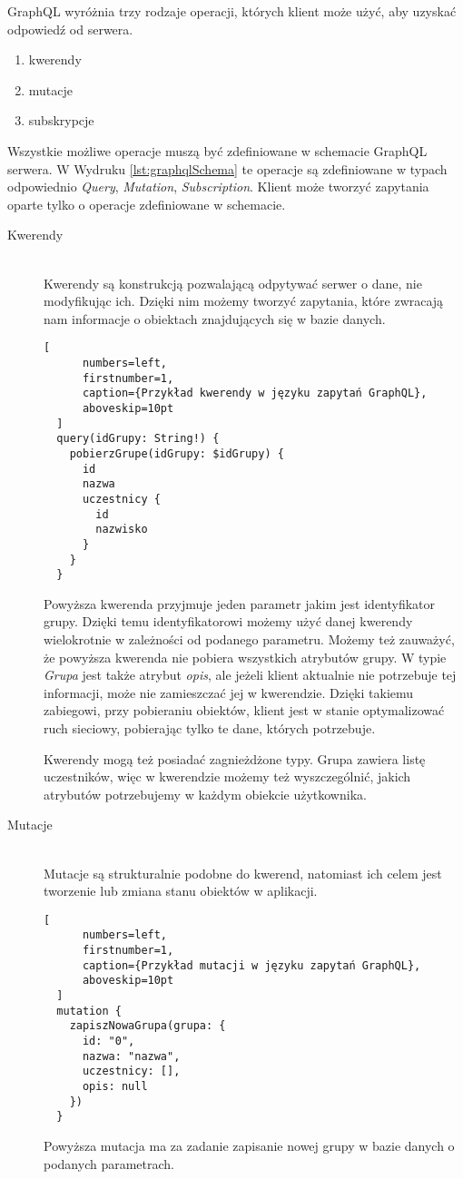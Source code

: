 GraphQL wyróżnia trzy rodzaje operacji, których klient może użyć, aby uzyskać odpowiedź od serwera.
\begin{enumerate}
  \item kwerendy
  \item mutacje
  \item subskrypcje
\end{enumerate}
Wszystkie możliwe operacje muszą być zdefiniowane w schemacie GraphQL serwera. W Wydruku \ref{lst:graphqlSchema} te operacje są zdefiniowane w typach odpowiednio \emph{Query}, \emph{Mutation}, \emph{Subscription}. Klient może tworzyć zapytania oparte tylko o operacje zdefiniowane w schemacie.

\begin{description}
  \item[Kwerendy] \hfill \\ Kwerendy są konstrukcją pozwalającą odpytywać serwer o dane, nie modyfikując ich. Dzięki nim możemy tworzyć zapytania, które zwracają nam informacje o obiektach znajdujących się w bazie danych.
  \begin{addmargin}[6mm]{0mm}
  \begin{lstlisting}[
      numbers=left,
      firstnumber=1,
      caption={Przykład kwerendy w języku zapytań GraphQL},
      aboveskip=10pt
  ]
  query(idGrupy: String!) {
    pobierzGrupe(idGrupy: $idGrupy) {
      id
      nazwa
      uczestnicy {
        id
        nazwisko
      }
    }
  }
  \end{lstlisting}
  \end{addmargin}

  Powyższa kwerenda przyjmuje jeden parametr jakim jest identyfikator grupy. Dzięki temu identyfikatorowi możemy użyć danej kwerendy wielokrotnie w zależności od podanego parametru. Możemy też zauważyć, że powyższa kwerenda nie pobiera wszystkich atrybutów grupy. W typie \emph{Grupa} jest także atrybut \emph{opis}, ale jeżeli klient aktualnie nie potrzebuje tej informacji, może nie zamieszczać jej w kwerendzie. Dzięki takiemu zabiegowi, przy pobieraniu obiektów, klient jest w stanie optymalizować ruch sieciowy, pobierając tylko te dane, których potrzebuje.

  Kwerendy mogą też posiadać zagnieżdżone typy. Grupa zawiera listę uczestników, więc w kwerendzie możemy też wyszczególnić, jakich atrybutów potrzebujemy w każdym obiekcie użytkownika.
  \newline
  \item[Mutacje] \hfill \\ Mutacje są strukturalnie podobne do kwerend, natomiast ich celem jest tworzenie lub zmiana stanu obiektów w aplikacji.
  \begin{addmargin}[6mm]{0mm}
  \begin{lstlisting}[
      numbers=left,
      firstnumber=1,
      caption={Przykład mutacji w języku zapytań GraphQL},
      aboveskip=10pt
  ]
  mutation {
    zapiszNowaGrupa(grupa: {
      id: "0",
      nazwa: "nazwa",
      uczestnicy: [],
      opis: null
    })
  }
  \end{lstlisting}
  \end{addmargin}
  Powyższa mutacja ma za zadanie zapisanie nowej grupy w bazie danych o podanych parametrach.


\end{description}
